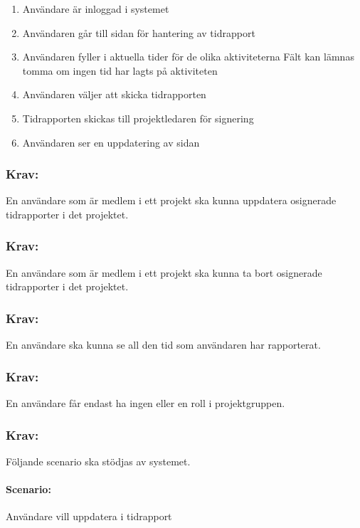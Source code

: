 \documentclass[paper=a4, fontsize=11pt,twoside]{article}
\begin{document}
	\begin{enumerate}
		\item	Användare är inloggad i systemet
		\item 	Användaren går till sidan för hantering av tidrapport
		\item 	Användaren fyller i aktuella tider för de olika aktiviteterna Fält kan lämnas tomma om ingen tid har lagts på aktiviteten
		\item	Användaren väljer att skicka tidrapporten
		\item 	Tidrapporten skickas till projektledaren för signering
		\item Användaren ser en uppdatering av sidan
		
		
	\end{enumerate}
	
	\subsubsection*{Krav:} En användare som är medlem i ett projekt ska kunna uppdatera osignerade tidrapporter i det projektet.
	\subsubsection*{Krav:} En användare som är medlem i ett projekt ska kunna ta bort osignerade tidrapporter i det projektet.
	\subsubsection*{Krav:}En användare ska kunna se all den tid som användaren har rapporterat.
	\subsubsection*{Krav:}En användare får endast ha ingen eller en roll i projektgruppen.
	\subsubsection*{Krav:} Följande scenario ska stödjas av systemet.
	\paragraph{Scenario:}Användare vill uppdatera i tidrapport
\end{document}
